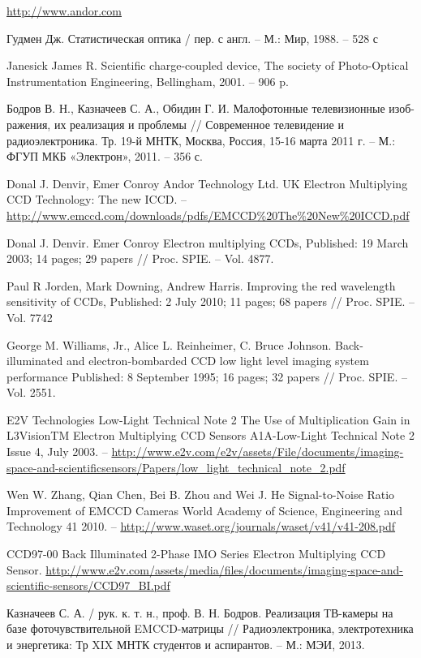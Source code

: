\documentclass[11pt]{article}
\begin{document}
\begin{thebibliography}{99}
\url{http://www.andor.com}

 Гудмен Дж. Статистическая оптика / пер. с англ. – М.: Мир, 1988. – 528 с

 Janesick James R. Scientific charge-coupled device, The society of Photo-Optical
Instrumentation Engineering, Bellingham, 2001. – 906 p.

 Бодров В. Н., Казначеев С. А., Обидин Г. И. Малофотонные телевизионные изоб-
ражения, их реализация и проблемы // Современное телевидение и радиоэлектроника.
Тр. 19-й МНТК, Москва, Россия, 15-16 марта 2011 г. – М.: ФГУП МКБ «Электрон»,
2011. – 356 с.
    
 Donal J. Denvir, Emer Conroy Andor Technology Ltd. UK Electron Multiplying CCD Technology: The new ICCD. – \url{http://www.emccd.com/downloads/pdfs/EMCCD%20The%20New%20ICCD.pdf}

 Donal J. Denvir. Emer Conroy Electron multiplying CCDs, Published: 19 March 2003; 14 pages; 29 papers // Proc. SPIE. – Vol. 4877.
    
 Paul R Jorden, Mark Downing, Andrew Harris. Improving the red wavelength sensitivity of CCDs, Published: 2 July 2010; 11 pages; 68 papers // Proc. SPIE. – Vol. 7742
    
 George M. Williams, Jr., Alice L. Reinheimer, C. Bruce Johnson. Back-illuminated and electron-bombarded CCD low light level imaging system performance Published: 8 September 1995; 16 pages; 32 papers // Proc. SPIE. – Vol. 2551.

 E2V Technologies Low-Light Technical Note 2 The Use of Multiplication Gain in
L3VisionTM Electron Multiplying CCD Sensors A1A-Low-Light Technical Note 2 Issue 4, July 2003. – \url{http://www.e2v.com/e2v/assets/File/documents/imaging-space-and-scientificsensors/Papers/low_light_technical_note_2.pdf}

 Wen W. Zhang, Qian Chen, Bei B. Zhou and Wei J. He Signal-to-Noise Ratio Improvement of EMCCD Cameras World Academy of Science, Engineering and Technology 41 2010. – \url{http://www.waset.org/journals/waset/v41/v41-208.pdf}

 CCD97-00 Back Illuminated 2-Phase IMO Series Electron Multiplying CCD Sensor. \url{http://www.e2v.com/assets/media/files/documents/imaging-space-and-scientific-sensors/CCD97_BI.pdf}

 Казначеев С. А. / рук. к. т. н., проф. В. Н. Бодров. Реализация ТВ-камеры на базе фоточувствительной EMCCD-матрицы // Радиоэлектроника, электротехника и энергетика: Тр XIX МНТК студентов и аспирантов. – М.: МЭИ, 2013.

\end{thebibliography}
\end{document}
